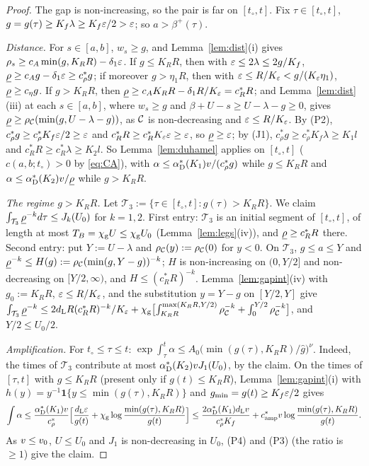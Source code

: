 \begin{proof}
The gap is non-increasing, so the pair is far on $[t_\circ,t]$. Fix $\tau\in[t_\circ,t]$, $g=g(\tau)\ge K_f\lambda\ge K_f\varepsilon/2>\varepsilon$; so
$a>\beta^+(\tau)$.

\emph{Distance.} For $s\in[a,b]$, $w_s\ge g$, and Lemma~\ref{lem:dist}(i) gives $\rho_s\ge c_A\min(g,K_RR)-\delta_1\varepsilon$. If
$g\le K_RR$, then with $\varepsilon\le2\lambda\le2g/K_f$, $\underline\rho\ge c_Ag-\delta_1\varepsilon\ge c_\rho^*g$; if moreover $g>\eta_1R$, then with
$\varepsilon\le R/K_\varepsilon<g/(K_\varepsilon\eta_1)$, $\underline\rho\ge c_\eta g$. If $g>K_RR$, then $\underline\rho\ge c_AK_RR-\delta_1R/K_\varepsilon=c_R^*R$; and
Lemma~\ref{lem:dist}(iii) at each $s\in[a,b]$, where $w_s\ge g$ and $\beta+U-s\ge U-\lambda-g\ge0$, gives
$\underline\rho\ge\rho_{\mathcal C}(\min(g,U-\lambda-g))$, as $\mathcal C$ is non-decreasing and $\varepsilon\le R/K_\varepsilon$. By (P2), $c_\rho^*g\ge c_\rho^*K_f\varepsilon/2\ge\varepsilon$
and $c_R^*R\ge c_R^*K_\varepsilon\varepsilon\ge\varepsilon$, so $\underline\rho\ge\varepsilon$; by (J1), $c_\rho^*g\ge c_\rho^*K_f\lambda\ge K_1l$ and $c_R^*R\ge c_R^*\lambda\ge K_2l$.
So Lemma~\ref{lem:duhamel} applies on $[t_\circ,t]$ ($c(a,b;t_\circ)>0$ by \eqref{eq:CA}), with $\alpha\le\alpha^*_{\mathrm D}(K_1)v/(c_\rho^*g)$ while
$g\le K_RR$ and $\alpha\le\alpha^*_{\mathrm D}(K_2)v/\underline\rho$ while $g>K_RR$.

\emph{The regime $g>K_RR$.} Let $\mathcal T_3:=\{\tau\in[t_\circ,t]:g(\tau)>K_RR\}$. We claim
$\int_{\mathcal T_3}\underline\rho^{-k}d\tau\le J_k(U_0)$ for $k=1,2$. First entry: $\mathcal T_3$ is an initial segment of $[t_\circ,t]$, of
length at most $T_B=\chi_{\mathrm g} U\le\chi_{\mathrm g} U_0$ (Lemma~\ref{lem:legs}(iv)), and $\underline\rho\ge c_R^*R$ there. Second entry: put $Y:=U-\lambda$
and $\rho_{\mathcal C}(y):=\rho_{\mathcal C}(0)$ for $y<0$. On $\mathcal T_3$, $g\le a\le Y$ and $\underline\rho^{-k}\le H(g):=\rho_{\mathcal C}(\min(g,Y-g))^{-k}$;
$H$ is non-increasing on $(0,Y/2]$ and non-decreasing on $[Y/2,\infty)$, and $H\le(c_R^*R)^{-k}$. Lemma~\ref{lem:gapint}(iv) with
$g_0:=K_RR$, $\varepsilon\le R/K_\varepsilon$, and the substitution $y=Y-g$ on $[Y/2,Y]$ give
$\int_{\mathcal T_3}\underline\rho^{-k}\le2d_{\mathrm L} R(c_R^*R)^{-k}/K_\varepsilon+\chi_{\mathrm g}\bigl[\int_{K_RR}^{\max(K_RR,Y/2)}\rho_{\mathcal C}^{-k}+\int_0^{Y/2}\rho_{\mathcal C}^{-k}\bigr]$,
and $Y/2\le U_0/2$.

\emph{Amplification.} For $t_\circ\le\tau\le t$: $\exp\int_\tau^t\alpha\le A_0\bigl(\min(g(\tau),K_RR)/\hat g\bigr)^\nu$. Indeed, the times
of $\mathcal T_3$ contribute at most $\alpha^*_{\mathrm D}(K_2)vJ_1(U_0)$, by the claim. On the times of $[\tau,t]$ with $g\le K_RR$ (present only if
$g(t)\le K_RR$), Lemma~\ref{lem:gapint}(i) with $h(y)=y^{-1}\mathbf 1\{y\le\min(g(\tau),K_RR)\}$ and $g_{\min}=g(t)\ge K_f\varepsilon/2$ gives
\[
\int\alpha\le\frac{\alpha^*_{\mathrm D}(K_1)v}{c_\rho^*}\Bigl[\frac{d_{\mathrm L}\varepsilon}{g(t)}+\chi_{\mathrm g}\log\frac{\min(g(\tau),K_RR)}{g(t)}\Bigr]
\le\frac{2\alpha^*_{\mathrm D}(K_1)d_{\mathrm L} v}{c_\rho^*K_f}+c^*_{\mathrm{amp}} v\log\frac{\min(g(\tau),K_RR)}{g(t)} .
\]
As $v\le v_0$, $U\le U_0$ and $J_1$ is non-decreasing in $U_0$, (P4) and (P3) (the ratio is $\ge1$) give the claim.


\end{proof}
